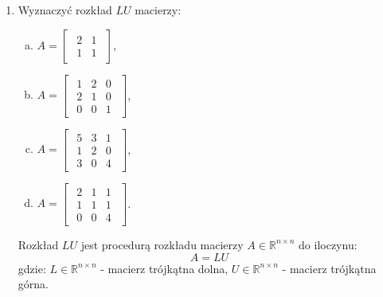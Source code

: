 \documentclass{article}
\begin{document}
\begin{enumerate}
\item Wyznaczyć rozkład $LU$ macierzy:
    \begin{enumerate}[a)]
        \item $A = \begin{bmatrix}\begin{array}{rr} 2 & 1 \\ 1 & 1 \end{array}\end{bmatrix}$,
        \item $A = \begin{bmatrix}\begin{array}{rrr} 1 & 2 & 0\\ 2 & 1 & 0\\ 0 & 0 & 1 \end{array}\end{bmatrix}$,
        \item $A = \begin{bmatrix}\begin{array}{rrr} 5 & 3 & 1\\ 1 & 2 & 0\\ 3 & 0 & 4 \end{array}\end{bmatrix}$,
        \item $A = \begin{bmatrix}\begin{array}{rrr} 2 & 1 & 1\\ 1 & 1 & 1\\ 0 & 0 & 4 \end{array}\end{bmatrix}$.
    \end{enumerate}

    Rozkład $LU$ jest procedurą rozkładu macierzy $A \in \mathbb{R}^{n \times n}$ do iloczynu:
    $$
        A = LU
    $$
    gdzie: $L \in \mathbb{R}^{n \times n}$ - macierz trójkątna dolna, $U \in \mathbb{R}^{n \times n}$ - macierz trójkątna górna.


\end{enumerate}
\end{document}
